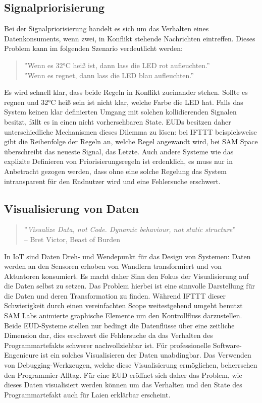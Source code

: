 \subsection{Signalpriorisierung}
Bei der Signalpriorisierung handelt es sich um das Verhalten eines Datenkonsuments, wenn zwei, in Konflikt stehende Nachrichten eintreffen. Dieses Problem kann im folgenden Szenario verdeutlicht werden:
\begin{quote}
''Wenn es 32°C heiß ist, dann lass die LED rot aufleuchten.'' \\
''Wenn es regnet, dann lass die LED blau aufleuchten.''
\end{quote}
Es wird schnell klar, dass beide Regeln in Konflikt zueinander stehen. Sollte es regnen und 32°C heiß sein ist nicht klar, welche Farbe die LED hat. Falls das System keinen klar definierten Umgang mit solchen kollidierenden Signalen besitzt, fällt es in einen nicht vorhersehbaren State. \acp{EUD} besitzen daher unterschiedliche Mechanismen dieses Dilemma zu lösen: bei IFTTT beispielsweise gibt die Reihenfolge der Regeln an, welche Regel angewandt wird, bei SAM Space überschreibt das neueste Signal, das Letzte. Auch andere Systeme wie das explizite Definieren von Priorisierungsregeln ist erdenklich, es muss nur in Anbetracht gezogen werden, dass ohne eine solche Regelung das System intransparent für den Endnutzer wird und eine Fehlersuche erschwert.

\subsection{Visualisierung von Daten}
\begin{quote}
    ''\textit{Visualize Data, not Code. Dynamic behaviour, not static structure}'' \\ -- Bret Victor, Beast of Burden
\end{quote}
In \ac{IoT} sind Daten Dreh- und Wendepunkt für das Design von Systemen: Daten werden an den Sensoren erhoben von Wandlern transformiert und von Aktuatoren konsumiert. Es macht daher Sinn den Fokus der Visualisierung auf die Daten selbst zu setzen. Das Problem hierbei ist eine sinnvolle Darstellung für die Daten und deren Transformation zu finden. Während IFTTT dieser Schwierigkeit durch einen vereinfachten Scope weitestgehend umgeht benutzt SAM Labs animierte graphische Elemente um den Kontrollfluss darzustellen. Beide \ac{EUD}-Systeme stellen nur bedingt die Datenflüsse über eine zeitliche Dimension dar, dies erschwert die Fehlersuche da das Verhalten des Programmartefakts schwerer nachvollziehbar ist. Für professionelle Software-Engenieure ist ein solches Visualisieren der Daten unabdingbar. Das Verwenden von Debugging-Werkzeugen, welche diese Visualisierung ermöglichen, beherrschen den Programmier-Alltag. Für eine \ac{EUD} eröffnet sich daher das Problem, wie dieses Daten visualisiert werden können um das Verhalten und den State des Programmartefakt auch für Laien erklärbar erscheint. 

